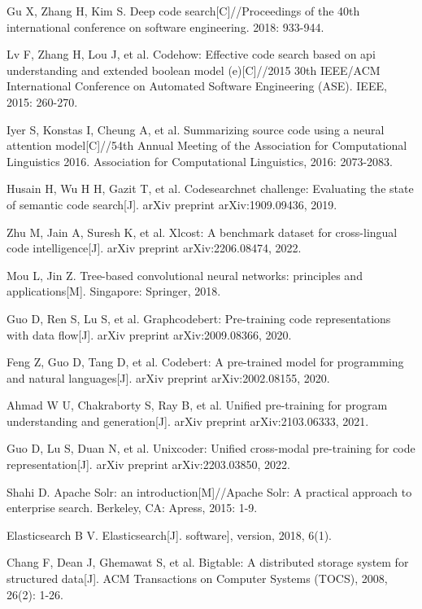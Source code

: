 \documentclass[UTF8,a4paper,12pt]{ctexart}
\numberwithin{equation}{section}
\begin{document}
\begin{thebibliography}{1}
\setlength{\itemsep}{0pt}
 Gu X, Zhang H, Kim S. Deep code search[C]//Proceedings of the 40th international conference on software engineering. 2018: 933-944.

 Lv F, Zhang H, Lou J, et al. Codehow: Effective code search based on api understanding and extended boolean model (e)[C]//2015 30th IEEE/ACM International Conference on Automated Software Engineering (ASE). IEEE, 2015: 260-270.

 Iyer S, Konstas I, Cheung A, et al. Summarizing source code using a neural attention model[C]//54th Annual Meeting of the Association for Computational Linguistics 2016. Association for Computational Linguistics, 2016: 2073-2083.

 Husain H, Wu H H, Gazit T, et al. Codesearchnet challenge: Evaluating the state of semantic code search[J]. arXiv preprint arXiv:1909.09436, 2019.

 Zhu M, Jain A, Suresh K, et al. Xlcost: A benchmark dataset for cross-lingual code intelligence[J]. arXiv preprint arXiv:2206.08474, 2022.

 Mou L, Jin Z. Tree-based convolutional neural networks: principles and applications[M]. Singapore: Springer, 2018.

 Guo D, Ren S, Lu S, et al. Graphcodebert: Pre-training code representations with data flow[J]. arXiv preprint arXiv:2009.08366, 2020.

 Feng Z, Guo D, Tang D, et al. Codebert: A pre-trained model for programming and natural languages[J]. arXiv preprint arXiv:2002.08155, 2020.

 Ahmad W U, Chakraborty S, Ray B, et al. Unified pre-training for program understanding and generation[J]. arXiv preprint arXiv:2103.06333, 2021.

 Guo D, Lu S, Duan N, et al. Unixcoder: Unified cross-modal pre-training for code representation[J]. arXiv preprint arXiv:2203.03850, 2022.

 Shahi D. Apache Solr: an introduction[M]//Apache Solr: A practical approach to enterprise search. Berkeley, CA: Apress, 2015: 1-9.

 Elasticsearch B V. Elasticsearch[J]. software], version, 2018, 6(1).

 Chang F, Dean J, Ghemawat S, et al. Bigtable: A distributed storage system for structured data[J]. ACM Transactions on Computer Systems (TOCS), 2008, 26(2): 1-26.


\end{thebibliography}
\end{document}
